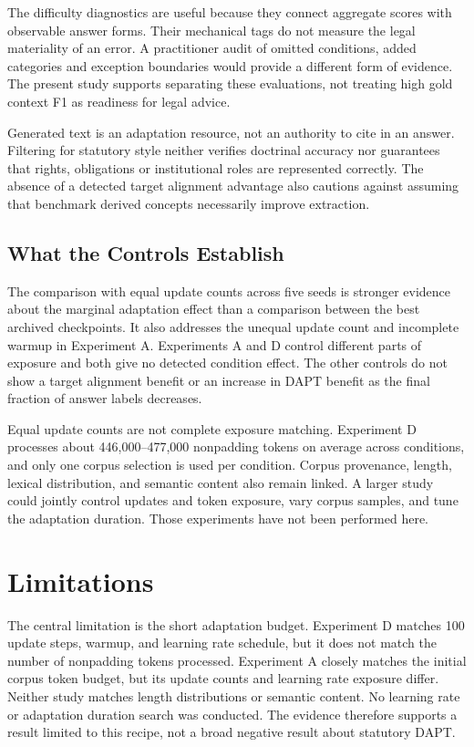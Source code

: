 \documentclass[pdflatex,sn-basic]{sn-jnl}
\begin{document}
The difficulty diagnostics are useful because they connect aggregate scores
with observable answer forms. Their mechanical tags do not measure the legal
materiality of an error. A practitioner audit of omitted conditions, added
categories and exception boundaries would provide a different form of evidence.
The present study supports separating these evaluations, not treating high
gold context F1 as readiness for legal advice.

Generated text is an adaptation resource, not an authority to cite in an
answer. Filtering for statutory style neither verifies doctrinal accuracy
nor guarantees that rights, obligations or institutional roles are represented
correctly. The absence of a detected target alignment advantage also cautions
against assuming that benchmark derived concepts necessarily improve extraction.

\subsection{What the Controls Establish}

The comparison with equal update counts across five seeds is stronger evidence about the marginal
adaptation effect than a comparison between the best archived checkpoints. It
also addresses the unequal update count and incomplete warmup in Experiment A.
Experiments A and D control different parts of exposure and both give no
detected condition effect. The other controls do not show a target alignment
benefit or an increase in DAPT benefit as the final fraction of answer labels
decreases.

Equal update counts are not complete exposure matching. Experiment D processes
about 446,000--477,000 nonpadding tokens on average across conditions, and
only one corpus selection is used per condition. Corpus provenance, length,
lexical distribution, and semantic content also remain linked. A larger study
could jointly control updates and token exposure, vary corpus samples, and tune
the adaptation duration. Those experiments have not been performed here.

\section{Limitations}\label{sec:limitations}

The central limitation is the short adaptation budget. Experiment D matches
100 update steps, warmup, and learning rate schedule, but it does not match the
number of nonpadding tokens processed. Experiment A closely matches the
initial corpus token budget, but its update counts and learning rate exposure
differ. Neither study matches length distributions or semantic content. No
learning rate or adaptation duration search was conducted. The evidence
therefore supports a result limited to this recipe, not a broad negative result
about statutory DAPT.
\end{document}
